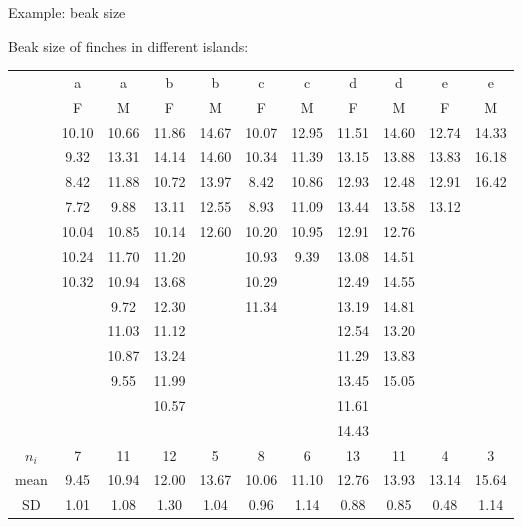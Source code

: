 \begin{frame}{Example: beak size}

    Beak size of finches in different islands:

    { \tiny
\begin{tabular}{c|cccccccccc}
    &   a & a & b & b & c & c & d & d & e & e \\
    &   F & M & F & M & F & M & F & M & F & M \\
    \hline
    & 10.10  &  10.66  & 11.86  &  14.67  &  10.07  & 12.95  &  11.51  &  14.60  &   12.74  & 14.33  \\
    & 9.32   &  13.31  & 14.14  &  14.60  &  10.34  & 11.39  &  13.15  &  13.88  &   13.83  & 16.18  \\
    & 8.42   &  11.88  & 10.72  &  13.97  &  8.42   & 10.86  &  12.93  &  12.48  &   12.91  & 16.42  \\
    & 7.72   &  9.88   & 13.11  &  12.55  &  8.93   & 11.09  &  13.44  &  13.58  &   13.12  & \\
    & 10.04  &  10.85  & 10.14  &  12.60  &  10.20  & 10.95  &  12.91  &  12.76  &          & \\
    & 10.24  &  11.70  & 11.20  &         &   10.93  & 9.39   &  13.08  &  14.51  &          & \\
    & 10.32  &  10.94  & 13.68  &         &   10.29  &        &   12.49  &  14.55  &          & \\
    &        &   9.72   & 12.30  &         &   11.34  &        &   13.19  &  14.81  &          & \\
    &        &   11.03  & 11.12  &         &          &         &   12.54  &  13.20  &          & \\
    &        &   10.87  & 13.24  &         &          &         &   11.29  &  13.83  &          & \\
    &        &   9.55   & 11.99  &         &          &         &   13.45  &  15.05  &          & \\
    &        &          &  10.57  &         &          &         &   11.61  &         &           & \\
    &        &          &         &          &          &         &   14.43  &         &           & \\
   \hline
$n_i$  &  7     &  11     &  12     &  5      &  8      &  6      &  13     &  11     &  4      &  3      \\
mean   &  9.45  &  10.94  &  12.00  &  13.67  &  10.06  &  11.10  &  12.76  &  13.93  &  13.14  &  15.64  \\
SD     &  1.01  &  1.08   &  1.30   &  1.04   &  0.96   &  1.14   &  0.88   &  0.85   &  0.48   &  1.14   \\
\end{tabular}
}
\end{frame}

